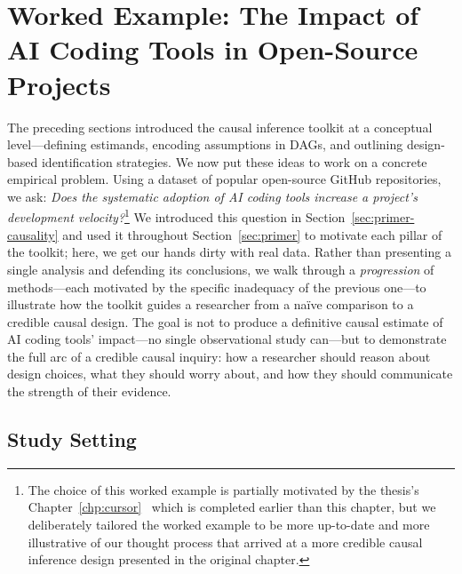 \section{Worked Example: The Impact of AI Coding Tools in Open-Source Projects}
\label{sec:worked-example}

The preceding sections introduced the causal inference toolkit at a conceptual level---defining estimands, encoding assumptions in DAGs, and outlining design-based identification strategies.
We now put these ideas to work on a concrete empirical problem.
Using a dataset of popular open-source GitHub repositories, we ask: \emph{Does the systematic adoption of AI coding tools increase a project's development velocity?}\footnote{The choice of this worked example is partially motivated by the thesis's Chapter~\ref{chp:cursor}~\cite{DBLP:conf/msr/HeMAKV26} which is completed earlier than this chapter, but we deliberately tailored the worked example to be more up-to-date and more illustrative of our thought process that arrived at a more credible causal inference design presented in the original chapter.}
We introduced this question in Section~\ref{sec:primer-causality} and used it throughout Section~\ref{sec:primer} to motivate each pillar of the toolkit; here, we get our hands dirty with real data.
Rather than presenting a single analysis and defending its conclusions, we walk through a \emph{progression} of methods---each motivated by the specific inadequacy of the previous one---to illustrate how the toolkit guides a researcher from a na\"ive comparison to a credible causal design.
The goal is not to produce a definitive causal estimate of AI coding tools' impact---no single observational study can---but to demonstrate the full arc of a credible causal inquiry: how a researcher should reason about design choices, what they should worry about, and how they should communicate the strength of their evidence.

\subsection{Study Setting}
\label{sec:study-setting}

